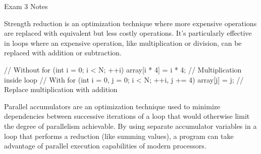 \begin{examnotes}{Exam 3 Notes}
\begin{highlight}
    \end{highlight}

    \begin{highlight}
        Strength reduction is an optimization technique where more expensive operations are replaced with equivalent but less costly operations. It’s particularly effective in loops where an expensive 
        operation, like multiplication or division, can be replaced with addition or subtraction.
    \begin{code}[C++]
    // Without
    for (int i = 0; i < N; ++i) {
        array[i * 4] = i * 4; // Multiplication inside loop
    }
    // With
    for (int i = 0, j = 0; i < N; ++i, j += 4) {
        array[j] = j; // Replace multiplication with addition
    }    
    \end{code}
    \end{highlight}

    \begin{highlight}
        Parallel accumulators are an optimization technique used to minimize dependencies between successive iterations of a loop that would otherwise limit the degree of parallelism achievable. By 
        using separate accumulator variables in a loop that performs a reduction (like summing values), a program can take advantage of parallel execution capabilities of modern processors.

    \end{highlight}


\end{examnotes}
